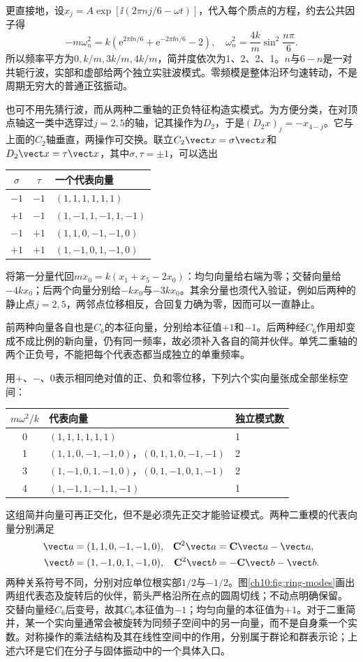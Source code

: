 更直接地，设$x_j=A\exp[\ii(2\pi nj/6-\omega t)]$，代入每个质点的方程，约去公共因子得
\[
 -m\omega_n^2=k(\mathrm e^{2\pi\ii n/6}+\mathrm e^{-2\pi\ii n/6}-2),
 \quad\omega_n^2=\frac{4k}{m}\sin^2\frac{n\pi}{6}.
\]
所以频率平方为$0,k/m,3k/m,4k/m$，简并度依次为1、2、2、1。$n$与$6-n$是一对共轭行波，实部和虚部给两个独立实驻波模式。零频模是整体沿环匀速转动，不是周期无穷大的普通正弦振动。

也可不用先猜行波，而从两种二重轴的正负特征构造实模式。为方便分类，在对顶点轴这一类中选穿过$j=2,5$的轴，记其操作为$D_2$，于是$(D_2x)_j=-x_{4-j}$。它与上面的$C_2$轴垂直，两操作可交换。联立$C_2\vect x=\sigma\vect x$和$D_2\vect x=\tau\vect x$，其中$\sigma,\tau=\pm1$，可以选出
\begin{center}\small
\begin{tabular}{ccl}
\toprule $\sigma$&$\tau$&一个代表向量\\\midrule
$-1$&$-1$&$(1,1,1,1,1,1)$\\
$+1$&$-1$&$(1,-1,1,-1,1,-1)$\\
$-1$&$+1$&$(1,1,0,-1,-1,0)$\\
$+1$&$+1$&$(1,-1,0,1,-1,0)$\\\bottomrule
\end{tabular}\end{center}
将第一分量代回$m\ddot x_0=k(x_1+x_5-2x_0)$：均匀向量给右端为零；交替向量给$-4kx_0$；后两个向量分别给$-kx_0$与$-3kx_0$。其余分量也须代入验证，例如后两种的静止点$j=2,5$，两邻点位移相反，合回复力确为零，因而可以一直静止。

前两种向量各自也是$C_6$的本征向量，分别给本征值$+1$和$-1$。后两种经$C_6$作用却变成不成比例的新向量，仍有同一频率，故必须补入各自的简并伙伴。单凭二重轴的两个正负号，不能把每个代表态都当成独立的单重频率。

用$+$、$-$、0表示相同绝对值的正、负和零位移，下列六个实向量张成全部坐标空间：
\begin{center}\small
\begin{tabular}{cll}
\toprule
$m\omega^2/k$&代表向量&独立模式数\\\midrule
0&$(1,1,1,1,1,1)$&1\\
1&$(1,1,0,-1,-1,0)$，$(0,1,1,0,-1,-1)$&2\\
3&$(1,-1,0,1,-1,0)$，$(0,1,-1,0,1,-1)$&2\\
4&$(1,-1,1,-1,1,-1)$&1\\\bottomrule
\end{tabular}\end{center}
这组简并向量可再正交化，但不是必须先正交才能验证模式。两种二重模的代表向量分别满足
\[
 \begin{aligned}
 \vect a&=(1,1,0,-1,-1,0),&\mathbf C^2\vect a&=\mathbf C\vect a-\vect a,\\
 \vect b&=(1,-1,0,1,-1,0),&\mathbf C^2\vect b&=-\mathbf C\vect b-\vect b.
 \end{aligned}
\]
两种关系符号不同，分别对应单位根实部$1/2$与$-1/2$。图\ref{ch10:fig:ring-modes}画出两组代表态及旋转后的伙伴，箭头严格沿所在点的圆周切线；不动点明确保留。
\chTenRingModesFigure
交替向量经$C_6$后变号，故其$C_6$本征值为$-1$；均匀向量的本征值为$+1$。对于二重简并，某一个实向量通常会被旋转为同频子空间中的另一向量，而不是自身乘一个实数。对称操作的乘法结构及其在线性空间中的作用，分别属于群论和群表示论；上述六环是它们在分子与固体振动中的一个具体入口。


